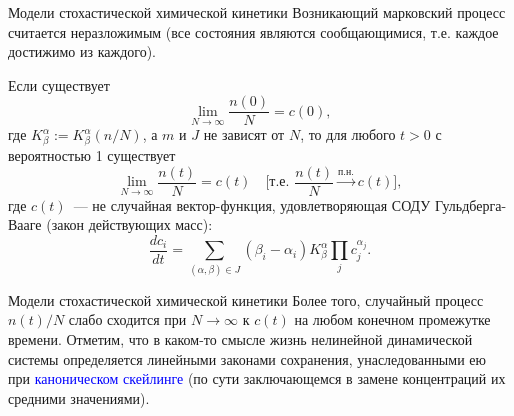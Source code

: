 \documentclass[aspectratio=169]{beamer}
\begin{document}
\begin{frame}{Модели стохастической химической кинетики}
    Возникающий марковский процесс считается неразложимым (все состояния являются сообщающимися, т.е. каждое достижимо из каждого).
    \begin{rustheorem}[Куртц]
        Если существует 
        \[ \lim_{N \to \infty} \dfrac{n(0)}{N} = c(0), \]
        где $K^{\alpha}_{\beta} := K^{\alpha}_{\beta}(n/N)$, а $m$ и $J$ не зависят от $N$, то для любого $t > 0$ с вероятностью 1 существует
        \[ \lim_{N \to \infty} \dfrac{n(t)}{N} = c(t) \quad \Big[ \text{т.е. } \dfrac{n(t)}{N} \xrightarrow{\text{п.н.}} c(t) \Big], \]
        где $c(t)$~--- не случайная вектор-функция, удовлетворяющая СОДУ Гульдберга-Вааге (закон действующих масс):
        \[ \dfrac{dc_i}{dt} = \sum\limits_{(\alpha, \beta) \in J} \left( \beta_i - \alpha_i \right) K^{\alpha}_{\beta} \prod_j c_j^{\alpha_j}. \]
    \end{rustheorem}
\end{frame}
\begin{frame}{Модели стохастической химической кинетики}
    Более того, случайный процесс $n(t)/N$ слабо сходится при $N \to \infty$ к $c(t)$ на любом конечном промежутке времени. Отметим, что в каком-то смысле жизнь нелинейной динамической системы определяется линейными законами сохранения, унаследованными ею при \textcolor{blue}{каноническом скейлинге} (по сути заключающемся в замене концентраций их средними значениями).
\end{frame}
\end{document}

